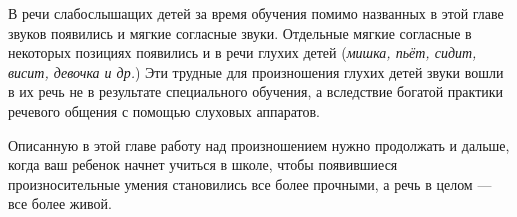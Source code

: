 \documentclass{book}
\renewcommand{\emph}[1]{\textit{#1}}
\begin{document}
В речи слабослышащих детей за время обучения помимо названных в этой
главе звуков появились и мягкие согласные звуки. Отдельные мягкие
согласные в некоторых позициях появились и в речи глухих детей
(\emph{мишка, пьёт, сидит, висит, девочка и др.}) Эти трудные для
произношения глухих детей звуки вошли в их речь не в результате
специального обучения, а вследствие богатой практики речевого общения с
помощью слуховых аппаратов.

Описанную в этой главе работу над произношением нужно продолжать и
дальше, когда ваш ребенок начнет учиться в школе, чтобы появившиеся
произносительные умения становились все более прочными, а речь в целом
--- все более живой.

\clearpage

\tableofcontents
\end{document}
